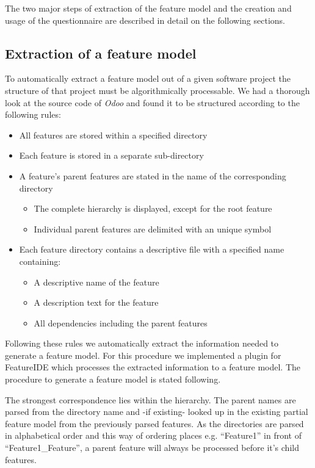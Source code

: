 The two major steps of extraction of the feature model and the creation and usage of the questionnaire are described in detail on the following sections.


\subsection{Extraction of a feature model}
To automatically extract a feature model out of a given software project the structure of that project must be algorithmically processable. We had a thorough look at the source code of \textit{Odoo} and found it to be structured according to the following rules:

\begin{itemize}
	\item All features are stored within a specified directory
	\item Each feature is stored in a separate sub-directory
	\item A feature's parent features are stated in the name of the corresponding directory
	\begin{itemize}
		\item The complete hierarchy is displayed, except for the root feature
		\item Individual parent features are delimited with an unique symbol
	\end{itemize}
	\item Each feature directory contains a descriptive file with a specified name containing:
	\begin{itemize}
		\item A descriptive name of the feature
		\item A description text for the feature
		\item All dependencies including the parent features
	\end{itemize}
\end{itemize}

Following these rules we automatically extract the information needed to generate a feature model. For this procedure we implemented a plugin for FeatureIDE which processes the extracted information to a feature model. The procedure to generate a feature model is stated following.

The strongest correspondence lies within the hierarchy. The parent names are parsed from the directory name and -if existing- looked up in the existing partial feature model from the previously parsed features. As the directories are parsed in alphabetical order and this way of ordering places e.g. ``Feature1'' in front of ``Feature1\_Feature'', a parent feature will always be processed before it's child features.

